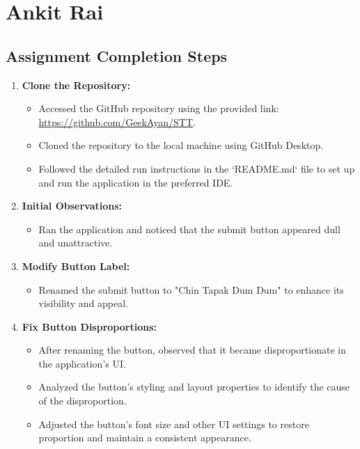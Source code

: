 \documentclass[a4paper,12pt]{article}
\begin{document}
\section{Ankit Rai}
\subsection{Assignment Completion Steps}

\begin{enumerate}
    \item \textbf{Clone the Repository:}
    \begin{itemize}
        \item Accessed the GitHub repository using the provided link: \url{https://github.com/GeekAyan/STT}.
        \item Cloned the repository to the local machine using GitHub Desktop.
        \item Followed the detailed run instructions in the `README.md` file to set up and run the application in the preferred IDE.
    \end{itemize}

    \item \textbf{Initial Observations:}
    \begin{itemize}
        \item Ran the application and noticed that the submit button appeared dull and unattractive.
    \end{itemize}

    \item \textbf{Modify Button Label:}
    \begin{itemize}
        \item Renamed the submit button to "Chin Tapak Dum Dum" to enhance its visibility and appeal.
    \end{itemize}

    \item \textbf{Fix Button Disproportions:}
    \begin{itemize}
        \item After renaming the button, observed that it became disproportionate in the application’s UI.
        \item Analyzed the button’s styling and layout properties to identify the cause of the disproportion.
        \item Adjusted the button’s font size and other UI settings to restore proportion and maintain a consistent appearance.
    \end{itemize}


\end{enumerate}
\end{document}
